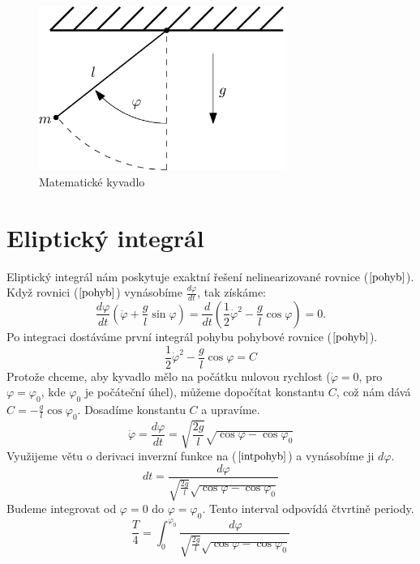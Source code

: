 \begin{figure}[h]
  \centering
  \includegraphics[width=8cm]{figures/KYVADLO.eps}
  \caption{Matematické kyvadlo}
  \label{fig:per}
\end{figure}

\section{Eliptický integrál}
\label{sec:Eliptický integrál}
Eliptický integrál nám poskytuje exaktní řešení nelinearizované rovnice ($\ref{pohyb}$). Když rovnici ($\ref{pohyb}$) vynásobíme $\frac{d\varphi}{dt}$, tak získáme:
\begin{equation*}
\frac{d\varphi}{dt}\left(\ddot{\varphi}+\frac{g}{l}\sin\varphi\right)=\frac{d}{dt}\left(\frac{1}{2}\dot{\varphi}^2-\frac{g}{l}\cos\varphi\right)=0.
\end{equation*}
Po integraci dostáváme první integrál pohybu pohybové rovnice ($\ref{pohyb}$).
\begin{equation}
\frac{1}{2}\dot{\varphi}^2-\frac{g}{l}\cos\varphi=C
\end{equation}
Protože chceme, aby kyvadlo mělo na počátku nulovou rychlost ($\dot{\varphi}=0$, pro $\varphi=\varphi_0$, kde $\varphi_0$ je počáteční úhel), můžeme dopočítat konstantu $C$, což nám dává $C=-\frac{g}{l}\cos\varphi_0$. Dosadíme konstantu $C$ a upravíme.
\begin{equation}
\label{intpohyb}
\dot{\varphi}=\frac{d\varphi}{dt}=\sqrt{\frac{2g}{l}}\sqrt{\cos\varphi-\cos\varphi_0}
\end{equation}
Využijeme větu o derivaci inverzní funkce na ($\ref{intpohyb}$) a vynásobíme ji $d\varphi$.
\begin{equation}
dt=\frac{d\varphi}{\sqrt{\frac{2g}{l}}\sqrt{\cos\varphi-\cos\varphi_0}}
\end{equation}
Budeme integrovat od $\varphi=0$ do $\varphi=\varphi_0$. Tento interval odpovídá čtvrtině periody.
\begin{equation}
\frac{T}{4}=\int_{0}^{\varphi_0}\frac{\,d\varphi}{\sqrt{\frac{2g}{l}}\sqrt{\cos\varphi-\cos\varphi_0}}
\end{equation}
